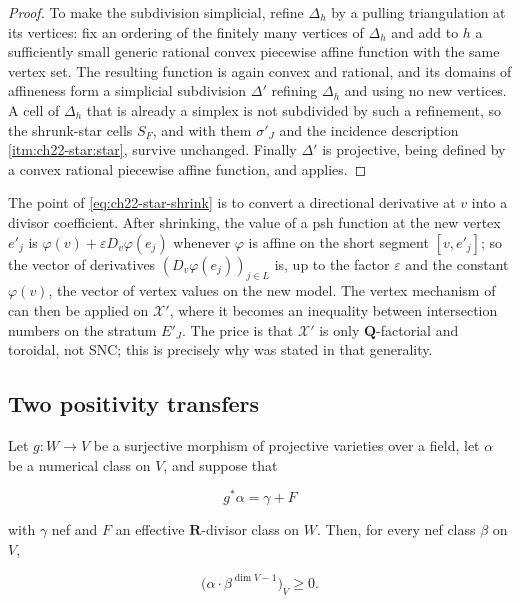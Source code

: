 \begin{proof}
To make the subdivision simplicial, refine $\Delta_h$ by a pulling
triangulation at its vertices: fix an ordering of the finitely many vertices
of $\Delta_h$ and add to $h$ a sufficiently small generic rational convex
piecewise affine function with the same vertex set.  The resulting function
is again convex and rational, and its domains of affineness form a
simplicial subdivision $\Delta'$ refining $\Delta_h$ and using no new
vertices.  A cell of $\Delta_h$ that is already a simplex is not
subdivided by such a refinement, so the shrunk-star cells $S_F$, and with
them $\sigma'_J$ and the incidence description
\cref{itm:ch22-star:star}, survive unchanged.  Finally
$\Delta'$ is projective, being defined by a convex rational piecewise
affine function, and  applies.
\end{proof}

\begin{remark}
\label{rem:ch22-why-shrink}
The point of \eqref{eq:ch22-star-shrink} is to convert a directional
derivative at $v$ into a divisor coefficient.  After shrinking, the value
of a psh function at the new vertex $e'_j$ is
$\varphi(v)+\varepsilon D_v\varphi(e_j)$ whenever $\varphi$ is affine on
the short segment $[v,e'_j]$; so the vector of derivatives
$(D_v\varphi(e_j))_{j\in L}$ is, up to the factor $\varepsilon$ and the
constant $\varphi(v)$, the vector of vertex values on the new model.  The
vertex mechanism of  can then be applied on
$\mathcal X'$, where it becomes an inequality between intersection numbers
on the stratum $E'_J$.  The price is that $\mathcal X'$ is only
$\mathbf Q$-factorial and toroidal, not SNC; this is precisely why
 was stated in that generality.
\end{remark}

\subsection{Two positivity transfers}

\begin{lemma}
\label{lem:ch22-pullback-positivity}
Let $g:W\to V$ be a surjective morphism of projective varieties over a
field, let $\alpha$ be a numerical class on $V$, and suppose that

\[
                 g^*\alpha=\gamma+F
\]

with $\gamma$ nef and $F$ an effective $\mathbf R$-divisor class on
$W$.  Then, for every nef class $\beta$ on $V$,

\[
                      \bigl(\alpha\cdot\beta^{\dim V-1}\bigr)_V\geq0 .
\tag{22.39}\label{eq:ch22-pullback-pseudoeffective}
\]
\end{lemma}

